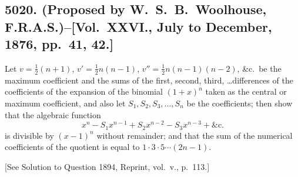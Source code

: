 \documentclass[11pt,a4paper]{book}
\begin{document}
\subsection*{5020. (Proposed by W.~S.~B.~Woolhouse, F.R.A.S.)\---[Vol.~XXVI., July to December, 1876, pp.~41, 42.]}

Let $v=\frac{1}{2}(n+1)$, $v'=\frac{1}{2}n(n-1)$, $v''=\frac{1}{2}n(n-1)(n-2)$, \&c.\ be the maximum coefficient and the sums of the first, second, third, \ldots differences of the coefficients of the expansion of the binomial $(1+x)^n$ taken as the central or maximum coefficient, and also let $S_1, S_2, S_3, \ldots, S_n$ be the coefficients; then show that the algebraic function
\[
x^n - S_1 x^{n-1} + S_2 x^{n-2} - S_3 x^{n-3} + \&\text{c.}
\]
is divisible by $(x-1)^n$ without remainder; and that the sum of the numerical coefficients of the quotient is equal to $1 \cdot 3 \cdot 5 \cdots (2n-1)$.

[See Solution to Question 1894, Reprint, vol.~v., p.~113.]
\end{document}
